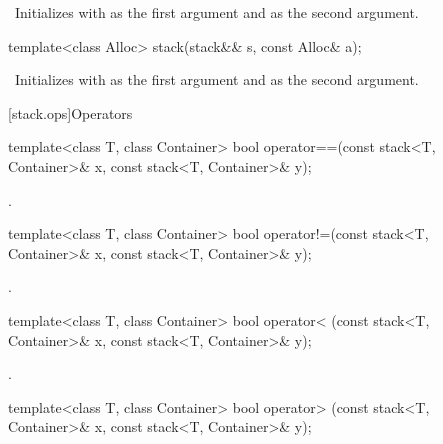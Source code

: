 \begin{itemdescr}
\pnum
\effects\ Initializes  with  as the first argument and 
as the second argument.
\end{itemdescr}

%
\begin{itemdecl}
template<class Alloc> stack(stack&& s, const Alloc& a);
\end{itemdecl}

\begin{itemdescr}
\pnum
\effects\ Initializes  with  as the first argument and 
as the second argument.
\end{itemdescr}

[stack.ops]{Operators}

%
\begin{itemdecl}
template<class T, class Container>
  bool operator==(const stack<T, Container>& x, const stack<T, Container>& y);
\end{itemdecl}

\begin{itemdescr}
\pnum
\returns
{}.
\end{itemdescr}

%
\begin{itemdecl}
template<class T, class Container>
  bool operator!=(const stack<T, Container>& x, const stack<T, Container>& y);
\end{itemdecl}

\begin{itemdescr}
\pnum
\returns
{}.
\end{itemdescr}

%
\begin{itemdecl}
template<class T, class Container>
  bool operator< (const stack<T, Container>& x, const stack<T, Container>& y);
\end{itemdecl}

\begin{itemdescr}
\pnum
\returns
{}.
\end{itemdescr}

%
\begin{itemdecl}
template<class T, class Container>
  bool operator> (const stack<T, Container>& x, const stack<T, Container>& y);
\end{itemdecl}

